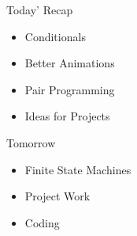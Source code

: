 \documentclass[10pt]{beamer}
\begin{document}
\begin{frame}{Today' Recap}
   	\begin{itemize}
	\item Conditionals
	\item Better Animations
	\item Pair Programming
	\item Ideas for Projects
	\end{itemize}
\end{frame}


\begin{frame}{Tomorrow}
   	\begin{itemize}
	\item Finite State Machines
	\item Project Work
	\item Coding
	\end{itemize}
\end{frame}
\end{document}
